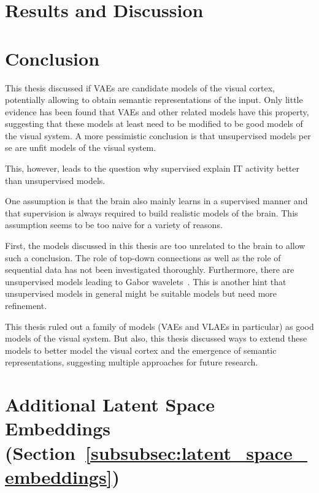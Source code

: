 \documentclass[11pt]{article}
\let\oldsection\section
\renewcommand\section{\clearpage\oldsection}
\newcounter{savepage}
\begin{document}
\section{Results and Discussion}\label{sec:results}


\acresetall
\section{Conclusion}\label{sec:conclusion}

This thesis discussed if \acfp{VAE} are candidate models of the visual cortex, potentially allowing to obtain semantic representations of the input.
Only little evidence has been found that \acp{VAE} and other related models have this property, suggesting that these models at least need to be modified to be good models of the visual system.
A more pessimistic conclusion is that unsupervised models per se are unfit models of the visual system.

This, however, leads to the question why supervised explain \ac{IT} activity better than unsupervised models.

One assumption is that the brain also mainly learns in a supervised manner and that supervision is always required to build realistic models of the brain.
This assumption seems to be too naive for a variety of reasons.

First, the models discussed in this thesis are too unrelated to the brain to allow such a conclusion.
The role of top-down connections as well as the role of sequential data has not been investigated thoroughly.
Furthermore, there are unsupervised models leading to Gabor wavelets~\citep{berkes2005slow}.
This is another hint that unsupervised models in general might be suitable models but need more refinement.

This thesis ruled out a family of models (\acp{VAE} and \acp{VLAE} in particular) as good models of the visual system.
But also, this thesis discussed ways to extend these models to better model the visual cortex and the emergence of semantic representations, suggesting multiple approaches for future research.

\newpage
\printbibliography

\newpage
{}
\setcounter{page}{\thesavepage}

\appendix

\section{Additional Latent Space Embeddings (Section~\ref{subsubsec:latent_space_embeddings})}
\end{document}
